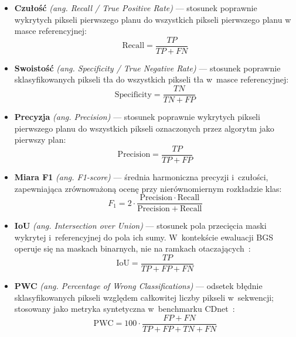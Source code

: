 \begin{itemize}
  \item \textbf{Czułość} \textit{(ang. Recall / True Positive Rate)} — stosunek
        poprawnie wykrytych pikseli pierwszego planu do wszystkich pikseli pierwszego
        planu w masce referencyjnej:
        \begin{equation}
          \mathrm{Recall} = \frac{TP}{TP + FN}
        \end{equation}

  \item \textbf{Swoistość} \textit{(ang. Specificity / True Negative Rate)} — stosunek
        poprawnie sklasyfikowanych pikseli tła do wszystkich pikseli tła w~masce
        referencyjnej:
        \begin{equation}
          \mathrm{Specificity} = \frac{TN}{TN + FP}
        \end{equation}

  \item \textbf{Precyzja} \textit{(ang. Precision)} — stosunek poprawnie wykrytych
        pikseli pierwszego planu do wszystkich pikseli oznaczonych przez algorytm jako
        pierwszy plan:
        \begin{equation}
          \mathrm{Precision} = \frac{TP}{TP + FP}
        \end{equation}

  \item \textbf{Miara F1} \textit{(ang. F1-score)} — średnia harmoniczna precyzji
        i~czułości, zapewniająca zrównoważoną ocenę przy nierównomiernym rozkładzie
        klas:
        \begin{equation}
          F_1 = 2 \cdot \frac{\mathrm{Precision} \cdot \mathrm{Recall}}
          {\mathrm{Precision} + \mathrm{Recall}}
        \end{equation}

  \item \textbf{IoU} \textit{(ang. Intersection over Union)} — stosunek pola
        przecięcia maski wykrytej i~referencyjnej do pola ich sumy. W~kontekście
        ewaluacji BGS operuje się na maskach binarnych, nie na ramkach
        otaczających~\cite{cdnet2014}:
        \begin{equation}
          \mathrm{IoU} = \frac{TP}{TP + FP + FN}
        \end{equation}

  \item \textbf{PWC} \textit{(ang. Percentage of Wrong Classifications)} — odsetek
        błędnie sklasyfikowanych pikseli względem całkowitej liczby pikseli w~sekwencji;
        stosowany jako metryka syntetyczna w~benchmarku CDnet~\cite{cdnet2014}:
        \begin{equation}
          \mathrm{PWC} = 100 \cdot \frac{FP + FN}{TP + FP + TN + FN}
        \end{equation}
\end{itemize}

